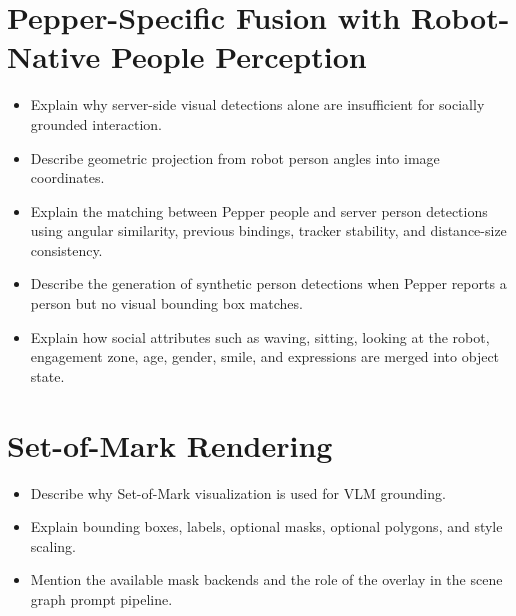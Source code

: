 \section{Pepper-Specific Fusion with Robot-Native People Perception}
\begin{itemize}
    \item Explain why server-side visual detections alone are insufficient for socially grounded interaction.
    \item Describe geometric projection from robot person angles into image coordinates.
    \item Explain the matching between Pepper people and server person detections using angular similarity, previous bindings, tracker stability, and distance-size consistency.
    \item Describe the generation of synthetic person detections when Pepper reports a person but no visual bounding box matches.
    \item Explain how social attributes such as waving, sitting, looking at the robot, engagement zone, age, gender, smile, and expressions are merged into object state.
\end{itemize}

\section{Set-of-Mark Rendering}
\begin{itemize}
    \item Describe why Set-of-Mark visualization is used for VLM grounding.
    \item Explain bounding boxes, labels, optional masks, optional polygons, and style scaling.
    \item Mention the available mask backends and the role of the overlay in the scene graph prompt pipeline.
\end{itemize}


